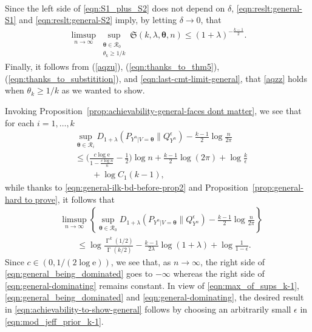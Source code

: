 \documentclass[journal, 10pt]{IEEEtran}
\newcommand{\rme}{\mathrm{e}}
\newcommand{\cR}{\mathcal{R}}
\newcommand{\mfrakS}{\mathfrak{S}}
\theoremstyle{plain}
\theoremstyle{plain}
\theoremstyle{plain}
\theoremstyle{plain}
\newcommand{\boldtheta}{\mathbold{\theta}}
\newcommand{\opGamma}{\operatorname{\Gamma}}
\begin{document}
\begin{IEEEproof}
\begin{align}
\end{align}	
Since the left side of \eqref{eqn:S1_plus_S2} does not depend on $\delta $, \eqref{eqn:reslt:general-S1} and \eqref{eqn:reslt:general-S2} imply, by letting $\delta \to 0 $, that 
\begin{align}
\limsup_{n\to \infty } \sup_{\substack{ \boldtheta \in \cR_0 \\ \theta_k \ge 1/k }} \mfrakS(k,\lambda, \boldtheta, n) \le (1+\lambda)^{-\frac{k-1}{2}}\text{.} \label{eqn:last-cmt-limit-general}
\end{align}
Finally, it follows from (\ref{aqzu}), (\ref{eqn:thanks_to_thm5}), (\ref{eqn:thanks_to_substitition}), and \eqref{eqn:last-cmt-limit-general}, that \eqref{aqzz} holds when $\theta_k \ge 1/k $ as we wanted to show.
\end{IEEEproof} 
Invoking Proposition~\ref{prop:achievability-general-faces dont matter}, we see that for each $i=1, \hdots, k $
\begin{align}
&\sup _{\boldtheta \in \cR_i}  D_{1+\lambda }\left( P_{Y^n|V=\boldtheta} \| Q_{Y^n}^{\epsilon}\right) - \frac{k-1}{2}\log \frac{n}{2\pi} \nonumber \\
&\le \bigg(\frac{c\log \rme }{1-\frac{c\log n }{n}}-\frac{1}{2} \bigg)\log n +\frac{k-1}{2}\log (2\pi)  +\log \frac{k}{\epsilon} \label{eqn:general_being_dominated}\\ 
&\qquad + \log C_1(k-1)  \text{,} \nonumber
\end{align}
while thanks to \eqref{eqn:general-ilk-bd-before-prop2} and Proposition~\ref{prop:general-hard to prove}, it follows that
\begin{align}
&\limsup_{n \to \infty } \left\{ \sup_{\boldtheta \in \cR_0 } D_{1+\lambda}(P_{Y^n | V=\boldtheta }\| Q_{Y^n}^\epsilon )-\frac{k-1}{2}\log \frac{n}{2\pi} \right\} \nonumber \\ 
&\qquad \le  \log \frac{\opGamma^k(1/2) }{\opGamma(k/2) }-\frac{k-1}{2\lambda} \log(1+\lambda) +\log \frac{1}{1-\epsilon }\text{.} \label{eqn:general-dominating}
\end{align} 
Since $c \in (0, 1/(2\log \rme)) $, we see that, as $n \to \infty $, the right side of \eqref{eqn:general_being_dominated} goes to $-\infty $ whereas the right side of \eqref{eqn:general-dominating} remains constant. In view of \eqref{eqn:max_of_sups_k-1}, \eqref{eqn:general_being_dominated} and \eqref{eqn:general-dominating}, the desired result in \eqref{eqn:achievability-to-show-general} follows by choosing an arbitrarily small $\epsilon $ in \eqref{eqn:mod_jeff_prior_k-1}.  \hfill \IEEEQED
\end{document}
